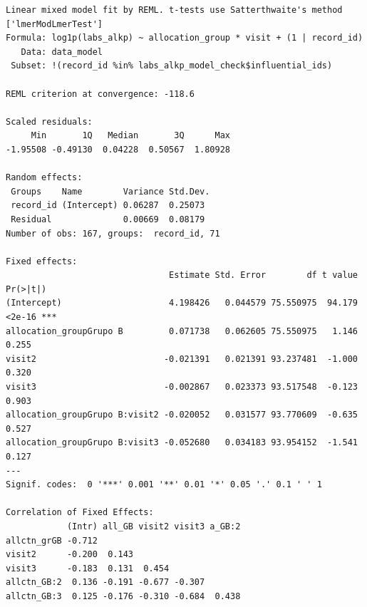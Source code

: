 \documentclass[
  12pt,
]{article}
\newenvironment{Shaded}{\begin{snugshade}}{\end{snugshade}}
\newcommand{\NormalTok}[1]{\textcolor[rgb]{0.00,0.23,0.31}{#1}}
\newcommand{\SpecialCharTok}[1]{\textcolor[rgb]{0.37,0.37,0.37}{#1}}
\begin{document}
\begin{verbatim}
Linear mixed model fit by REML. t-tests use Satterthwaite's method ['lmerModLmerTest']
Formula: log1p(labs_alkp) ~ allocation_group * visit + (1 | record_id)
   Data: data_model
 Subset: !(record_id %in% labs_alkp_model_check$influential_ids)

REML criterion at convergence: -118.6

Scaled residuals: 
     Min       1Q   Median       3Q      Max 
-1.95508 -0.49130  0.04228  0.50567  1.80928 

Random effects:
 Groups    Name        Variance Std.Dev.
 record_id (Intercept) 0.06287  0.25073 
 Residual              0.00669  0.08179 
Number of obs: 167, groups:  record_id, 71

Fixed effects:
                                Estimate Std. Error        df t value Pr(>|t|)    
(Intercept)                     4.198426   0.044579 75.550975  94.179   <2e-16 ***
allocation_groupGrupo B         0.071738   0.062605 75.550975   1.146    0.255    
visit2                         -0.021391   0.021391 93.237481  -1.000    0.320    
visit3                         -0.002867   0.023373 93.517548  -0.123    0.903    
allocation_groupGrupo B:visit2 -0.020052   0.031577 93.770609  -0.635    0.527    
allocation_groupGrupo B:visit3 -0.052680   0.034183 93.954152  -1.541    0.127    
---
Signif. codes:  0 '***' 0.001 '**' 0.01 '*' 0.05 '.' 0.1 ' ' 1

Correlation of Fixed Effects:
            (Intr) all_GB visit2 visit3 a_GB:2
allctn_grGB -0.712                            
visit2      -0.200  0.143                     
visit3      -0.183  0.131  0.454              
allctn_GB:2  0.136 -0.191 -0.677 -0.307       
allctn_GB:3  0.125 -0.176 -0.310 -0.684  0.438
\end{verbatim}

\begin{Shaded}
\end{Shaded}
\end{document}
